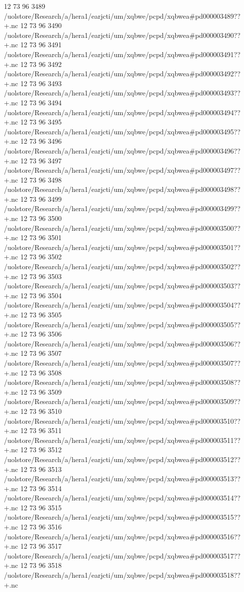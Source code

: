 12 73 96
3489
/uolstore/Research/a/hera1/earjcti/um/xqbwe/pcpd/xqbwea#pd000003489??+.nc
12 73 96
3490
/uolstore/Research/a/hera1/earjcti/um/xqbwe/pcpd/xqbwea#pd000003490??+.nc
12 73 96
3491
/uolstore/Research/a/hera1/earjcti/um/xqbwe/pcpd/xqbwea#pd000003491??+.nc
12 73 96
3492
/uolstore/Research/a/hera1/earjcti/um/xqbwe/pcpd/xqbwea#pd000003492??+.nc
12 73 96
3493
/uolstore/Research/a/hera1/earjcti/um/xqbwe/pcpd/xqbwea#pd000003493??+.nc
12 73 96
3494
/uolstore/Research/a/hera1/earjcti/um/xqbwe/pcpd/xqbwea#pd000003494??+.nc
12 73 96
3495
/uolstore/Research/a/hera1/earjcti/um/xqbwe/pcpd/xqbwea#pd000003495??+.nc
12 73 96
3496
/uolstore/Research/a/hera1/earjcti/um/xqbwe/pcpd/xqbwea#pd000003496??+.nc
12 73 96
3497
/uolstore/Research/a/hera1/earjcti/um/xqbwe/pcpd/xqbwea#pd000003497??+.nc
12 73 96
3498
/uolstore/Research/a/hera1/earjcti/um/xqbwe/pcpd/xqbwea#pd000003498??+.nc
12 73 96
3499
/uolstore/Research/a/hera1/earjcti/um/xqbwe/pcpd/xqbwea#pd000003499??+.nc
12 73 96
3500
/uolstore/Research/a/hera1/earjcti/um/xqbwe/pcpd/xqbwea#pd000003500??+.nc
12 73 96
3501
/uolstore/Research/a/hera1/earjcti/um/xqbwe/pcpd/xqbwea#pd000003501??+.nc
12 73 96
3502
/uolstore/Research/a/hera1/earjcti/um/xqbwe/pcpd/xqbwea#pd000003502??+.nc
12 73 96
3503
/uolstore/Research/a/hera1/earjcti/um/xqbwe/pcpd/xqbwea#pd000003503??+.nc
12 73 96
3504
/uolstore/Research/a/hera1/earjcti/um/xqbwe/pcpd/xqbwea#pd000003504??+.nc
12 73 96
3505
/uolstore/Research/a/hera1/earjcti/um/xqbwe/pcpd/xqbwea#pd000003505??+.nc
12 73 96
3506
/uolstore/Research/a/hera1/earjcti/um/xqbwe/pcpd/xqbwea#pd000003506??+.nc
12 73 96
3507
/uolstore/Research/a/hera1/earjcti/um/xqbwe/pcpd/xqbwea#pd000003507??+.nc
12 73 96
3508
/uolstore/Research/a/hera1/earjcti/um/xqbwe/pcpd/xqbwea#pd000003508??+.nc
12 73 96
3509
/uolstore/Research/a/hera1/earjcti/um/xqbwe/pcpd/xqbwea#pd000003509??+.nc
12 73 96
3510
/uolstore/Research/a/hera1/earjcti/um/xqbwe/pcpd/xqbwea#pd000003510??+.nc
12 73 96
3511
/uolstore/Research/a/hera1/earjcti/um/xqbwe/pcpd/xqbwea#pd000003511??+.nc
12 73 96
3512
/uolstore/Research/a/hera1/earjcti/um/xqbwe/pcpd/xqbwea#pd000003512??+.nc
12 73 96
3513
/uolstore/Research/a/hera1/earjcti/um/xqbwe/pcpd/xqbwea#pd000003513??+.nc
12 73 96
3514
/uolstore/Research/a/hera1/earjcti/um/xqbwe/pcpd/xqbwea#pd000003514??+.nc
12 73 96
3515
/uolstore/Research/a/hera1/earjcti/um/xqbwe/pcpd/xqbwea#pd000003515??+.nc
12 73 96
3516
/uolstore/Research/a/hera1/earjcti/um/xqbwe/pcpd/xqbwea#pd000003516??+.nc
12 73 96
3517
/uolstore/Research/a/hera1/earjcti/um/xqbwe/pcpd/xqbwea#pd000003517??+.nc
12 73 96
3518
/uolstore/Research/a/hera1/earjcti/um/xqbwe/pcpd/xqbwea#pd000003518??+.nc
